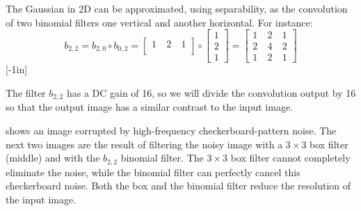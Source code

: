 The Gaussian in 2D can be approximated, using separability, as the convolution of two binomial filters one vertical and another horizontal. For instance:
\begin{equation}
	b_{2,2} = b_{2,0} \circ b_{0,2} =  \begin{bmatrix}
		1 ~ & 2 ~ & 1 \\
	\end{bmatrix}\circ \begin{bmatrix}
		1 \\
		2 \\
		1
	\end{bmatrix}=
	\begin{bmatrix}
		1 ~ & 2 ~ & 1 \\
		2 ~ & 4 ~ & 2 \\
		1~  & 2 ~ & 1
	\end{bmatrix}
\end{equation}
[-1in]

The filter $b_{2,2}$ has a DC gain of 16, so we will divide the convolution output by 16 so that the output image has a similar contrast to the input image.

\Fig{\ref{fig:boat_b_noise}} shows an image corrupted by high-frequency checkerboard-pattern noise. The next two images are the result of filtering the noisy image with a $3\times3$ box filter (middle) and with the $b_{2,2}$ binomial filter.
The $3\times3$ box filter cannot completely eliminate the noise, while the binomial filter can perfectly cancel this checkerboard noise. Both the box and the binomial filter reduce the resolution of the input image.

